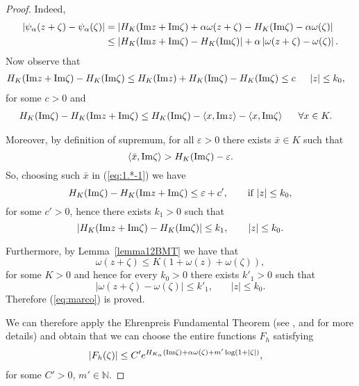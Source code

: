 \documentclass[twoside]{amsart}
\begin{document}
\begin{proof}
Indeed,
\begin{align*}
\left|\psi_{\alpha}(z+\zeta)-\psi_{\alpha}(\zeta)\right| & =
\left|H_{K}({\mathop{\rm Im}\nolimits} z+{\mathop{\rm Im}\nolimits}\zeta)+\alpha\omega(z+\zeta)-H_{K}({\mathop{\rm Im}\nolimits}\zeta)-
\alpha\omega(\zeta)\right|\\
 & \leq\left|H_{K}({\mathop{\rm Im}\nolimits} z+{\mathop{\rm Im}\nolimits}\zeta)-H_{K}({\mathop{\rm Im}\nolimits}\zeta)\right|+\alpha
\left|\omega(z+\zeta)-\omega(\zeta)\right|.
\end{align*}
Now observe that 
\begin{align*}
H_{K}({\mathop{\rm Im}\nolimits} z+{\mathop{\rm Im}\nolimits}\zeta)-H_{K}({\mathop{\rm Im}\nolimits}\zeta) & \leq H_{K}({\mathop{\rm Im}\nolimits} z)+H_{K}({\mathop{\rm Im}\nolimits}\zeta)
-H_{K}({\mathop{\rm Im}\nolimits}\zeta)\leq c\,\,\,\,\,\,\,\,\,|z|\leq k_{0},
\end{align*}
for some $c>0$ and
\begin{align}
H_{K}({\mathop{\rm Im}\nolimits}\zeta)-H_{K}({\mathop{\rm Im}\nolimits} z+{\mathop{\rm Im}\nolimits}\zeta) & \leq H_{K}({\mathop{\rm Im}\nolimits}\zeta)
-\left\langle x,{\mathop{\rm Im}\nolimits} z\right\rangle -\left\langle x,{\mathop{\rm Im}\nolimits}\zeta\right\rangle 
\,\,\,\,\,\,\,\,\,\forall x\in K.
\label{eq:1.*-1}
\end{align}

Moreover, by definition of supremum, for all $\varepsilon>0$ there exists
$\bar{x}\in K$ such that
\[
\left\langle \bar{x},{\mathop{\rm Im}\nolimits}\zeta\right\rangle >H_{K}({\mathop{\rm Im}\nolimits}\zeta)-\varepsilon.
\]
So, choosing such $\bar{x}$ in (\ref{eq:1.*-1}) we have
\[
H_{K}({\mathop{\rm Im}\nolimits}\zeta)-H_{K}({\mathop{\rm Im}\nolimits} z+{\mathop{\rm Im}\nolimits}\zeta)\leq\varepsilon+c',
\qquad\mbox{if}\ |z|\leq k_{0},
\]
for some $c'>0$, hence there exists $k_{1}>0$ such that
\[
\left|H_{K}({\mathop{\rm Im}\nolimits} z+{\mathop{\rm Im}\nolimits}\zeta)-H_{K}({\mathop{\rm Im}\nolimits}\zeta)\right|\leq k_{1},
\qquad|z|\leq k_{0}.
\]

Furthermore, by Lemma~\ref{lemma12BMT} we have that
\[
\omega(z+\zeta)\leq K(1+\omega(z)+\omega(\zeta)),
\]
for some $K>0$ and hence for every $k_{0}>0$ there exists $k'_{1}>0$
such that 
\[
\left|\omega(z+\zeta)-\omega(\zeta)\right|\leq k'_{1},
\,\,\,\,\,\,\,\,\,\,\,|z|\leq k_{0}.
\]
Therefore (\ref{eq:marco}) is proved. 

We can therefore apply the Ehrenpreis Fundamental Theorem (see
\cite[Thm. 7.7.13]{H3}, and \cite{B,G} for more details)
and obtain that we can choose the entire functions $F_{h}$ satisfying
\begin{align*}
\left|F_{h}(\zeta)\right| & \leq C'e^{H_{K_{\alpha}}({\mathop{\rm Im}\nolimits}\zeta)+\alpha\omega(\zeta)
+m'\log(1+|\zeta|)},
\end{align*}
for some $C'>0$, $m'\in{\mathbb N}$.


\end{proof}
\end{document}
